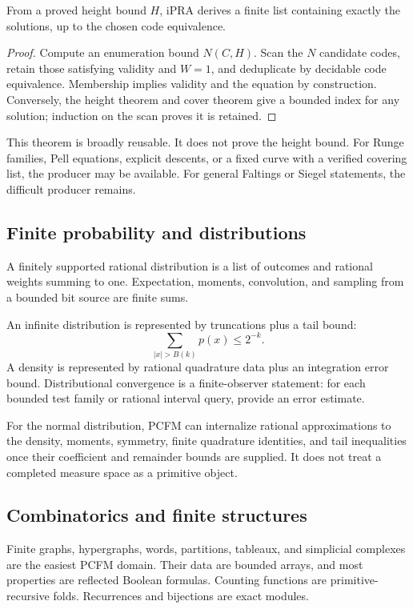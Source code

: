 \begin{theorem}
From a proved height bound \(H\), iPRA derives a finite list containing exactly
the solutions, up to the chosen code equivalence.
\end{theorem}

\begin{proof}
Compute an enumeration bound \(N(C,H)\).  Scan the \(N\) candidate codes,
retain those satisfying validity and \(W=1\), and deduplicate by decidable code
equivalence.  Membership implies validity and the equation by construction.
Conversely, the height theorem and cover theorem give a bounded index for any
solution; induction on the scan proves it is retained.
\end{proof}

This theorem is broadly reusable.  It does not prove the height bound.  For
Runge families, Pell equations, explicit descents, or a fixed curve with a
verified covering list, the producer may be available.  For general Faltings
or Siegel statements, the difficult producer remains.

\subsection{Finite probability and distributions}

A finitely supported rational distribution is a list of outcomes and rational
weights summing to one.  Expectation, moments, convolution, and sampling from a
bounded bit source are finite sums.

An infinite distribution is represented by truncations plus a tail bound:
\[
  \sum_{|x|>B(k)}p(x)\le2^{-k}.
\]
A density is represented by rational quadrature data plus an integration error
bound.  Distributional convergence is a finite-observer statement: for each
bounded test family or rational interval query, provide an error estimate.

For the normal distribution, PCFM can internalize rational approximations to
the density, moments, symmetry, finite quadrature identities, and tail
inequalities once their coefficient and remainder bounds are supplied.  It
does not treat a completed measure space as a primitive object.

\subsection{Combinatorics and finite structures}

Finite graphs, hypergraphs, words, partitions, tableaux, and simplicial
complexes are the easiest PCFM domain.  Their data are bounded arrays, and
most properties are reflected Boolean formulas.  Counting functions are
primitive-recursive folds.  Recurrences and bijections are exact modules.

